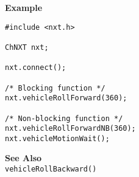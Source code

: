 \noindent
{\bf Example}
\begin{lstlisting}
#include <nxt.h>

ChNXT nxt;

nxt.connect();

/* Blocking function */
nxt.vehicleRollForward(360);

/* Non-blocking function */
nxt.vehicleRollForwardNB(360);
nxt.vehicleMotionWait();
\end{lstlisting}

\noindent
{\bf See Also}\\
\texttt{vehicleRollBackward()}

